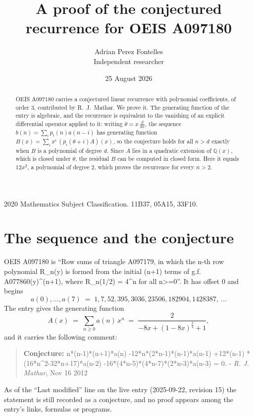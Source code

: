 \documentclass[11pt,a4paper]{article}
\title{A proof of the conjectured recurrence for OEIS A097180}
\author{Adrian Perez Fontelles\\ \small Independent researcher}
\date{25 August 2026}
\theoremstyle{plain}
\theoremstyle{definition}
\begin{document}
\maketitle

\begin{abstract}
OEIS A097180 carries a conjectured linear recurrence with polynomial coefficients, of
order 3, contributed by R.~J.~Mathar. We prove it. The generating function of the
entry is algebraic, and the recurrence is equivalent to the vanishing of an explicit
differential operator applied to it: writing $\theta=x\,\frac{d}{dx}$, the sequence
$b(n)=\sum_{i}p_{i}(n)a(n-i)$ has generating function
$B(x)=\sum_{i}x^{i}\,(p_{i}(\theta+i)A)(x)$, so the conjecture holds for all $n>d$ exactly
when $B$ is a polynomial of degree $d$. Since $A$ lies in a quadratic extension of
$\mathbb{Q}(x)$, which is closed under $\theta$, the residual $B$ can be computed in
closed form. Here it equals $12 x^{2}$, a polynomial of degree $2$, which proves
the recurrence for every $n>2$.
\end{abstract}

\noindent\small 2020 Mathematics Subject Classification. 11B37, 05A15, 33F10.\normalsize

\section{The sequence and the conjecture}

OEIS A097180 is ``Row sums of triangle A097179, in which the n-th row polynomial R\_n(y) is formed from the initial (n+1) terms of g.f. A077860(y)\^{}(n+1), where R\_n(1/2) = 4\^{}n for all n>=0''. It has offset $0$ and begins
\[
a(0),\dots,a(7)\;=\;1, 7, 52, 395, 3036, 23506, 182904, 1428387,\ \dots
\]
The entry gives the generating function
\begin{equation}\label{eq:gf}
A(x)\;=\;\sum_{n\ge 0} a(n)\,x^{n}\;=\;\frac{2}{- 8 x + \left(1 - 8 x\right)^{\frac{3}{4}} + 1} ,
\end{equation}
and it carries the following comment:
\begin{quote}\small
\textbf{Conjecture:} n*(n-1)*(n+1)*a(n) -12*n*(2*n-1)*(n-1)*a(n-1) +12*(n-1) * (16*n\^{}2-32*n+17)*a(n-2) -16*(4*n-5)*(4*n-7)*(2*n-3)*a(n-3) = 0. - \emph{R. J. Mathar}, Nov 16 2012
\end{quote}
As of the ``Last modified'' line on the live entry (2025-09-22, revision 15) the
statement is still recorded as a conjecture, and no proof appears among the entry's links,
formulas or programs.
\end{document}
